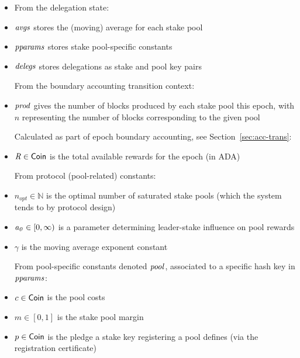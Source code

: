 \begin{itemize}
\item[] From the delegation state:
\item $\mathit{avgs}$ stores the (moving) average for each
stake pool
\item $\mathit{pparams}$ stores stake pool-specific constants
\item $\mathit{delegs}$ stores delegations as stake and pool key pairs \medskip

From the boundary accounting transition context:
\item $\mathit{prod}$ gives the number of blocks produced by each stake pool
this epoch, with $n$ representing the number of blocks corresponding to the
given pool \medskip

Calculated as part of epoch boundary accounting, see
Section~\ref{sec:acc-trans}:
\item $\mathit{R} \in \mathsf{Coin}$ is the total available rewards for the epoch (in ADA) \medskip

From protocol (pool-related) constants:
\item $n_{opt} \in \mathbb{N}$ is the optimal number of saturated stake pools (which the system
tends to by protocol design)
\item $\mathit{a_0} \in [0, \infty)$ is a parameter determining leader-stake
influence on pool rewards
\item $\gamma$ is the moving average exponent constant \medskip

From pool-specific constants denoted $\mathit{pool}$, associated to a specific
hash key in $\mathit{pparams}$:
\item $c \in \mathsf{Coin}$ is the pool costs
\item $m \in [0,1]$ is the stake pool margin
\item $p \in \mathsf{Coin}$ is the pledge a stake key registering a pool defines (via
the registration certificate)\medskip


\end{itemize}
